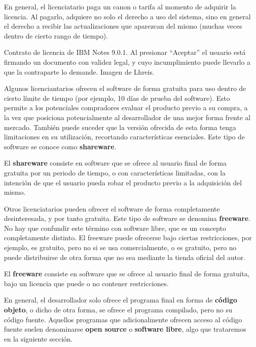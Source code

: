 En general, el licenciatario paga un canon o tarifa al momento de adquirir la
licencia. Al pagarlo, adquiere no solo el derecho a uso del sistema, sino en
general el derecho a recibir las actualizaciones que aparezcan del mismo (muchas
veces dentro de cierto rango de tiempo).

{Contrato de licencia de IBM Notes 9.0.1. Al presionar ``Aceptar'' el usuario
está firmando un documento con validez legal, y cuyo incumplimiento puede
llevarlo a que la contraparte lo demande.} {Imagen de Lhreis.}

Algunos licenciantarios ofrecen el software de forma gratuita para uso dentro de
cierto límite de tiempo (por ejemplo, 10 días de prueba del software). Esto
permite a los potenciales compradores evaluar el producto previo a su compra, a
la vez que posiciona potencialmente al desarrollador de una mejor forma frente
al mercado. También puede suceder que la versión ofrecida de esta forma tenga
limitaciones en su utilización, recortando características esenciales. Este tipo
de software se conoce como \textbf{shareware}.

\begin{definition} El \textbf{shareware} consiste en software
    que se ofrece al usuario final de forma gratuita por un periodo de tiempo, o
    con características limitadas, con la intención de que el usuario pueda
    robar el producto previo a la adquisición del
    mismo.\autocite{mw_shareware_2018}
\end{definition}

Otros licenciatarios pueden ofrecer el software de forma completamente
desinteresada, y por tanto gratuita. Este tipo de software se denomina
\textbf{freeware}. No hay que confundir este término con software libre, que es
un concepto completamente distinto. El freeware puede ofrecerse bajo ciertas
restricciones, por ejemplo, es gratuito, pero no si se usa comercialmente, o es
gratuito, pero no puede distribuirse de otra forma que no sea mediante la tienda
oficial del autor.

\begin{definition} El \textbf{freeware} consiste en software que
    se ofrece al usuario final de forma gratuita, bajo un licencia que puede o
    no contener restricciones.\autocite{mw_freeware_2018}
\end{definition}

En general, el desarrollador solo ofrece el programa final en forma de
\textbf{código objeto}, o dicho de otra forma, se ofrece el programa compilado,
pero no su código fuente. Aquellos programas que adicionalmente ofrecen acceso
al código fuente suelen denominarse \textbf{open source} o \textbf{software
libre}, algo que trataremos en la siguiente sección.

